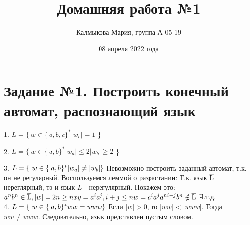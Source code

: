 \documentclass{article}
\title{Домашняя работа №1}
\author{Калмыкова Мария, группа А-05-19}
\date{08 апреля 2022 года}
\begin{document}
\maketitle

\section{Задание №1. Построить конечный автомат, распознающий язык}
1. $ L = \{\ w \in \{\ a, b, c\}^{*} | w_{c}| = 1$ \}\
\begin{figure}[ht!]
\vspace{2ex} 
\centering

\end{figure}

2. $L = \{\ w \in \{\ a, b\}^{*} | w_{a}|  \leq 2 |w_{b}| \geq 2$ \}\
\begin{figure}[ht!]
\vspace{2ex} 
\centering

\end{figure}

3. $L = \{\ w \in \{\ a, b\}^{*} | w_{a}|  \neq |w_{b}|\}\ \\ $
Невозможно построить заданный автомат, т.к. он не регулярный. Воспользуемся леммой о разрастании:
Т.к. язык $ \overline { \rm L } $ нереглярный, то и язык $L$ - нерегулярный.
Покажем это: 
$\\ a^{n}b^{n} \in \overline { \rm L }, |w| = 2n \geq n \\ xy = a^{i}a^{j}, i+j \leq n \\ w = a^{i}a^{j}a^{ni-j}b^{n} \notin \overline { \rm L } \\ $
Ч.т.д.\\
 
4. $L = \{\ w \in \{\ a, b\}^{*} ww = www\}\ \\ $
Если $|w| > 0$, то $|ww| < |www|$. Тогда $ww \neq www$. Следовательно, язык представлен пустым словом.
\begin{figure}[ht!]
\vspace{2ex} 
\centering

\end{figure}
\end{document}

